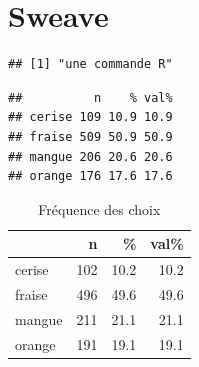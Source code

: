 \documentclass[a4paper, 10pt]{article}\usepackage[]{graphicx}\usepackage[]{xcolor}
\makeatletter
\newenvironment{kframe}{%
 \def\at@end@of@kframe{}%
 \ifinner\ifhmode%
  \def\at@end@of@kframe{\end{minipage}}%
  \begin{minipage}{\columnwidth}%
 \fi\fi%
 \def\FrameCommand##1{\hskip\@totalleftmargin \hskip-\fboxsep
 \colorbox{shadecolor}{##1}\hskip-\fboxsep
     \hskip-\linewidth \hskip-\@totalleftmargin \hskip\columnwidth}%
 \MakeFramed {\advance\hsize-\width
   \@totalleftmargin\z@ \linewidth\hsize
   \@setminipage}}%
 {\par\unskip\endMakeFramed%
 \at@end@of@kframe}
\newenvironment{knitrout}{}{} %
\makeatother
\begin{document}
\section{Sweave}
\begin{knitrout}
\color{fgcolor}\begin{kframe}
\begin{verbatim}
## [1] "une commande R"
\end{verbatim}
\end{kframe}
\end{knitrout}




\begin{knitrout}
\color{fgcolor}\begin{kframe}
\begin{verbatim}
##          n    % val%
## cerise 109 10.9 10.9
## fraise 509 50.9 50.9
## mangue 206 20.6 20.6
## orange 176 17.6 17.6
\end{verbatim}
\end{kframe}
\end{knitrout}


\begin{knitrout}
\color{fgcolor}\begin{table}[!h]

\caption{\label{tab:freqchoix}Fréquence des choix}
\centering
\begin{tabular}[t]{lrrr}
\toprule
  & n & \% & val\%\\
\midrule
cerise & 102 & 10.2 & 10.2\\
fraise & 496 & 49.6 & 49.6\\
mangue & 211 & 21.1 & 21.1\\
orange & 191 & 19.1 & 19.1\\
\bottomrule
\end{tabular}
\end{table}

\end{knitrout}
\end{document}
